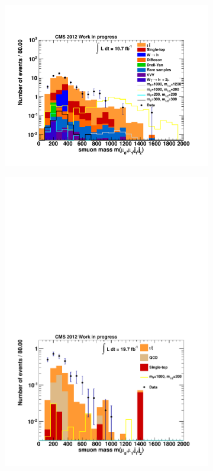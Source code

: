 \begin{figure}[h!]
  \centering
  \begin{subfigure}[b]{0.495\textwidth}
    \centering
    \includegraphics[width=\textwidth]{plots/CR6_m_smuon_singlefake.pdf}
    \caption{\label{fig:CRBVC_m_smuon_singlefake}}
  \end{subfigure}
  \begin{subfigure}[b]{0.495\textwidth}
    \centering
    \includegraphics[width=\textwidth]{plots/CR6_m_smuon_doublefake.pdf}
    \caption{\label{fig:CRBVC_m_smuon_doublefake}}
  \end{subfigure}


\end{figure}
